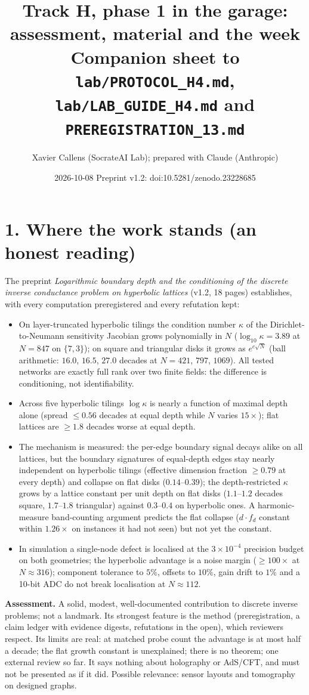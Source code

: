 \documentclass[11pt,a4paper]{article}
\title{Track H, phase 1 in the garage: assessment, material and the week\\[2pt]
\large Companion sheet to \texttt{lab/PROTOCOL\_H4.md}, \texttt{lab/LAB\_GUIDE\_H4.md} and \texttt{PREREGISTRATION\_13.md}}
\author{Xavier Callens (SocrateAI Lab); prepared with Claude (Anthropic)}
\date{2026-10-08 \quad Preprint v1.2: doi:10.5281/zenodo.23228685}
\begin{document}
\maketitle

\section*{1. Where the work stands (an honest reading)}
The preprint \emph{Logarithmic boundary depth and the conditioning of the discrete inverse conductance problem on
hyperbolic lattices} (v1.2, 18 pages) establishes, with every computation preregistered and every refutation kept:
\begin{itemize}
\item On layer-truncated hyperbolic tilings the condition number $\kappa$ of the Dirichlet-to-Neumann sensitivity
  Jacobian grows polynomially in $N$ ($\log_{10}\kappa=3.89$ at $N=847$ on $\{7,3\}$); on square and triangular disks it grows
  as $e^{c\sqrt N}$ (ball arithmetic: $16.0$, $16.5$, $27.0$ decades at $N=421$, $797$, $1069$). All tested networks are
  exactly full rank over two finite fields: the difference is conditioning, not identifiability.
\item Across five hyperbolic tilings $\log\kappa$ is nearly a function of maximal depth alone (spread $\le0.56$ decades at
  equal depth while $N$ varies $15\times$); flat lattices are $\ge1.8$ decades worse at equal depth.
\item The mechanism is measured: the per-edge boundary signal decays alike on all lattices, but the boundary
  signatures of equal-depth edges stay nearly independent on hyperbolic tilings (effective dimension fraction $\ge0.79$ at
  every depth) and collapse on flat disks ($0.14$--$0.39$); the depth-restricted $\kappa$ grows by a lattice constant per
  unit depth on flat disks ($1.1$--$1.2$ decades square, $1.7$--$1.8$ triangular) against $0.3$--$0.4$ on hyperbolic ones.
  A harmonic-measure band-counting argument predicts the flat collapse ($d\cdot f_d$ constant within $1.26\times$ on
  instances it had not seen) but not yet the constant.
\item In simulation a single-node defect is localised at the $3\times10^{-4}$ precision budget on both geometries; the
  hyperbolic advantage is a noise margin ($\ge100\times$ at $N\approx316$); component tolerance to $5\%$, offsets to
  $10\%$, gain drift to $1\%$ and a 10-bit ADC do not break localisation at $N\approx112$.
\end{itemize}
\textbf{Assessment.} A solid, modest, well-documented contribution to discrete inverse problems; not a landmark. Its
strongest feature is the method (preregistration, a claim ledger with evidence digests, refutations in the open), which
reviewers respect. Its limits are real: at matched probe count the advantage is at most half a decade; the flat growth
constant is unexplained; there is no theorem; one external review so far. It says nothing about holography or AdS/CFT,
and must not be presented as if it did. Possible relevance: sensor layouts and tomography on designed graphs.
\end{document}
